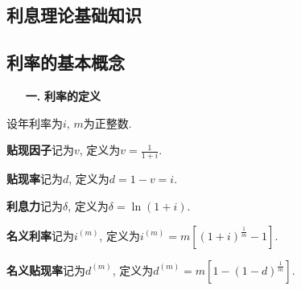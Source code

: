 \documentclass[a4paper,10pt]{ctexbook}
\newcommand{\hei}{\CJKfamily{hei}}      %
\begin{document}
\begin{appendix}
    \chapter{利息理论基础知识}
    \section{利率的基本概念}
    \begin{itemize}
        \item[{\bf\hei 一.}]{\bf\hei 利率的定义}
    \end{itemize}

    设年利率为$i$, $m$为正整数.

    \textbf{贴现因子}记为$v$, 定义为$v=\frac{1}{1+i}$.

    \textbf{贴现率}记为$d$, 定义为$d=1-v=i$.

    \textbf{利息力}记为$\delta$, 定义为$\delta=\ln(1+i)$.

    \textbf{名义利率}记为$i^{(m)}$, 定义为$i^{(m)}=m[(1+i)^{\frac{1}{m}}-1]$.

    \textbf{名义贴现率}记为$d^{(m)}$, 定义为$d^{(m)}=m[1-(1-d)^{\frac{1}{m}}]$.
\end{appendix}
\end{document}
